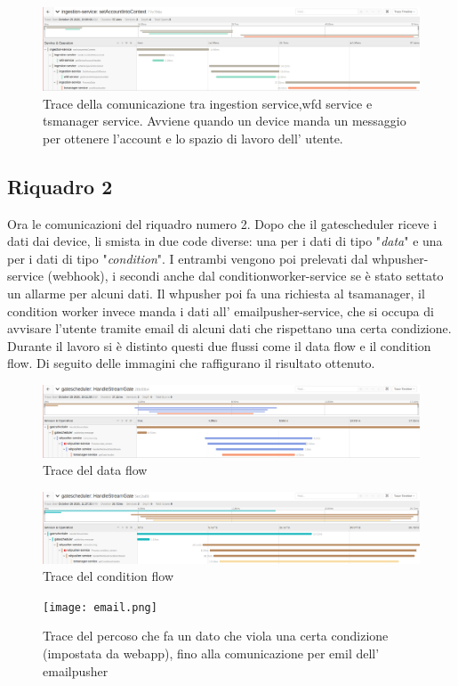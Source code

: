 \documentclass[a4paper,12pt,titlepage,italian,openany]{report}
\begin{document}
\begin{figure}[H]
    \includegraphics[scale=0.21]{75.png}
    \centering
    \caption{Trace della comunicazione tra ingestion service,wfd service e tsmanager service. Avviene quando un device manda un messaggio per ottenere l'account e lo spazio di lavoro dell' utente.}
\end{figure}
\subsection{Riquadro 2}
Ora le comunicazioni del riquadro numero 2. Dopo che il gatescheduler riceve i dati dai device, li smista in due code diverse: una per i dati di tipo "\textit{data}" e una per i dati di tipo "\textit{condition}". I entrambi vengono poi prelevati dal whpusher-service (webhook), i secondi anche dal conditionworker-service se è stato settato un  allarme per alcuni dati. Il whpusher poi fa una richiesta al tsamanager, il condition worker invece manda i dati all' emailpusher-service, che si occupa di avvisare l'utente tramite email di alcuni dati che rispettano una certa condizione.
\\Durante il lavoro si è distinto questi due flussi come il data flow e il condition flow. Di seguito delle immagini che raffigurano il risultato ottenuto.

\begin{figure}[H]
    \includegraphics[scale=0.21]{76.png}
    \centering
    \caption{Trace del data flow}
\end{figure}
\begin{figure}[H]
    \includegraphics[scale=0.21]{77.png}
    \centering
    \caption{Trace del condition flow}
\end{figure}
\begin{figure}[H]
    \texttt{[image: email.png]}
    \centering
    \caption{Trace del percoso che fa un dato che viola una certa condizione (impostata da webapp), fino alla comunicazione per emil dell' emailpusher}
\end{figure}
\end{document}
